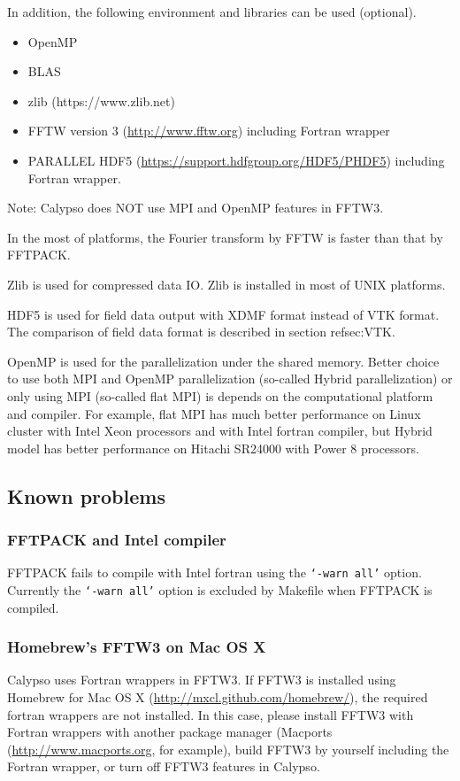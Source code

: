 In addition, the following environment and libraries can be used (optional).
\begin{itemize}
\item OpenMP 
\item BLAS
\item zlib (https://www.zlib.net)
\item FFTW version 3 (\url{http://www.fftw.org}) including Fortran wrapper
\item PARALLEL HDF5 (\url{https://support.hdfgroup.org/HDF5/PHDF5})  including Fortran wrapper.
\end{itemize}
Note: Calypso does NOT use MPI and OpenMP features in FFTW3. 

In the most of platforms, the Fourier transform by FFTW is faster than that by FFTPACK. 

Zlib is used for compressed data IO. Zlib is installed in most of UNIX platforms.

HDF5 is used for field data output with XDMF format instead of VTK format. The comparison of field data format is described in section ref{sec:VTK}. 

OpenMP is used for the parallelization under the shared memory. Better choice to use both MPI and OpenMP parallelization (so-called Hybrid parallelization) or only using MPI (so-called flat MPI) is depends on the computational platform and compiler. For example, flat MPI has much better performance on Linux cluster with Intel Xeon processors and with Intel fortran compiler, but Hybrid model has better performance on Hitachi SR24000 with Power 8 processors.

\subsection{Known problems}
\subsubsection*{FFTPACK and Intel compiler}
FFTPACK fails to compile with Intel fortran using the {\tt `-warn all'} option. Currently the {\tt `-warn all'} option is excluded by Makefile when FFTPACK is compiled.

\subsubsection*{Homebrew's FFTW3 on Mac OS X}
Calypso uses Fortran wrappers in FFTW3. If FFTW3 is installed using Homebrew for Mac OS X (\url{http://mxcl.github.com/homebrew/}), the required fortran wrappers are not installed. In this case, please install FFTW3 with Fortran wrappers with another package manager (Macports (\url{http://www.macports.org}, for example), build FFTW3 by yourself including the Fortran wrapper, or turn off FFTW3 features in Calypso.


